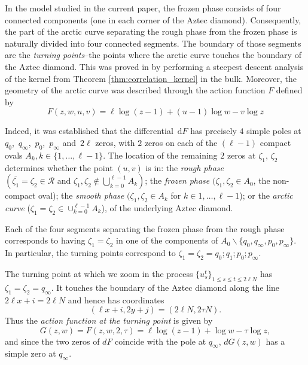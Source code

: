 \documentclass[11pt]{article}
\theoremstyle{plain}
\theoremstyle{definition}
\numberwithin{equation}{section}
\renewcommand{\d}{\,\mathrm{d}}
\begin{document}
{In the model studied in the current paper, the frozen phase consists of four connected components (one in each corner of the Aztec diamond). Consequently, the part of the arctic curve separating the rough phase from the frozen phase is naturally divided into four connected segments. The boundary of those segments are the \textit{turning points}--the points where the arctic curve touches the boundary of the Aztec diamond.
This was proved in \cite{Ber21} by performing a steepest descent analysis of the kernel from Theorem \ref{thm:correlation_kernel} in the bulk. 
Moreover, the geometry of the arctic curve was described through the action function $F$ defined by 
\begin{equation}
F(z,w, u,v)=
\ell\log(z-1)+\left(u-1\right)\log w-v\log z
\end{equation}

Indeed, it was established that the differential $\d F$ has precisely $4$ simple poles at~$q_0$,~$q_{\infty}$,~$p_0$,~$p_{\infty}$ and~$2\ell$ zeros, with  $2$ zeros on each of the $(\ell-1)$ compact ovals $A_k, k\in\{1,\ldots, \ell-1\}$. The location of the remaining $2$ zeros at $\zeta_1$, $\zeta_2$ determines whether the point $(u,v)$  is in: the \textit{rough phase} 
 $(\overline{\zeta_1}=\zeta_2\in \mathcal{R} \text{ and } \zeta_1,\zeta_2 \not\in \bigcup_{k=0}^{\ell-1} A_k)$; the \textit{frozen phase} 
 $(\zeta_1, \zeta_2\in A_0$, the non-compact oval); the \textit{smooth phase} 
 $(\zeta_1, \zeta_2\in A_k$ for $k\in{1,\ldots,\ell-1}$); or the \textit{arctic curve} ($\zeta_1=\zeta_2\in \cup_{k=0}^{\ell-1} A_k$),  
 of the underlying Aztec diamond.
  
%
 Each of the four segments separating the frozen phase from the rough phase corresponds to having $\zeta_1=\zeta_2$ in one of the components of $A_0\backslash \{q_0,q_\infty,p_0,p_\infty\}$. In particular, the turning points correspond to $\zeta_1=\zeta_2=q_0; q_1; p_0; p_{\infty}$.} 
%
%
The turning point at which we zoom in the process $\{u_{s}^t\}_{1\leq s\leq t\leq2\ell N}$ has $\zeta_1=\zeta_2=q_{\infty}$. It touches the boundary of the Aztec diamond along the line $2\ell x+i =2\ell N$ and hence has coordinates
 $$(\ell x+ i,2y +j)= (2\ell N, 2 \tau  N).$$
Thus the \textit{action function at the turning point} is given by
\begin{equation}\label{eqn:action_fn_tp}
G(z,w)= F(z,w, 2, \tau )=\ell \log(z-1)+\log w -\tau  \log z,
\end{equation}
and since the two zeros of $dF$ coincide with the pole at $q_{\infty}$, $dG(z,w)$ has a simple zero at $q_{\infty}$.
\end{document}
